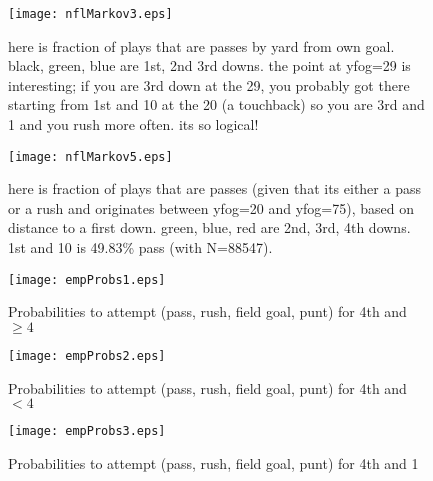 \documentclass{article}
\begin{document}
\begin{figure} [!ht] 
\begin{center}
\texttt{[image: nflMarkov3.eps]}
\end{center}
\caption{
here is fraction of plays that are passes by yard from own goal. black, green, blue are 1st, 2nd 3rd downs. the point at yfog=29 is interesting; if you are 3rd down at the 29, you probably got there starting from 1st and 10 at the 20 (a touchback) so you are 3rd and 1 and you rush more often. its so logical!
 }
\label{fignm3}
\end{figure}

\begin{figure} [!ht] 
\begin{center}
\texttt{[image: nflMarkov5.eps]}
\end{center}
\caption{
here is fraction of plays that are passes (given that its either a pass or a rush and originates between yfog=20 and yfog=75), based on distance to a first down. green, blue, red are 2nd, 3rd, 4th downs. 1st and 10 is 49.83\% pass (with N=88547).
 }
\label{fignm5}
\end{figure}


\begin{figure} [!ht] 
\begin{center}
\texttt{[image: empProbs1.eps]}
\end{center}
\caption{
Probabilities to attempt (pass, rush, field goal, punt) for 4th and $\ge 4$
 }
\label{figep1}
\end{figure}

\begin{figure} [!ht] 
\begin{center}
\texttt{[image: empProbs2.eps]}
\end{center}
\caption{
Probabilities to attempt (pass, rush, field goal, punt) for 4th and $< 4$
 }
\label{figep2}
\end{figure}

\begin{figure} [!ht] 
\begin{center}
\texttt{[image: empProbs3.eps]}
\end{center}
\caption{
Probabilities to attempt (pass, rush, field goal, punt) for 4th and 1
 }
\label{figep3}
\end{figure}
\end{document}
